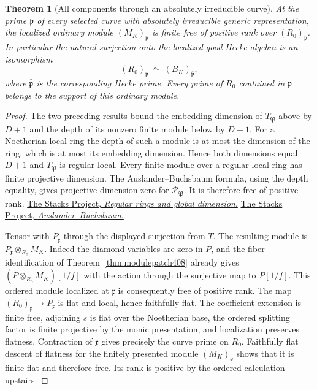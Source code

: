 \documentclass[a4paper,11pt]{article}
\newtheorem{theorem}[proposition]{Theorem}
\theoremstyle{definition}
\theoremstyle{remark}
\numberwithin{equation}{section}
\begin{document}
\begin{theorem}[All components through an absolutely irreducible curve]\leavevmode
\label{thm:irrcurvesupport409}
At the prime \(\mathfrak p\) of every selected curve with
absolutely irreducible generic representation, the localized
ordinary module \((M_K)_{\mathfrak p}\) is finite free of
positive rank over \((R_0)_{\mathfrak p}\). In particular
the natural surjection onto the localized good Hecke algebra
is an isomorphism
\[
                   (R_0)_{\mathfrak p}
                        \ \simeq\ (B_K)_{\bar{\mathfrak p}},
\]
where \(\bar{\mathfrak p}\) is the corresponding Hecke prime.
Every prime of \(R_0\) contained in \(\mathfrak p\) belongs
to the support of this ordinary module.
\end{theorem}
\begin{proof}
The two preceding results bound the embedding dimension of
\(T_{\mathfrak P}\) above by \(D+1\) and the depth of its
nonzero finite module below by \(D+1\). For a Noetherian
local ring the depth of such a module is at most the
dimension of the ring, which is at most its embedding
dimension. Hence both dimensions equal \(D+1\) and
\(T_{\mathfrak P}\) is regular local. Every finite module
over a regular local ring has finite projective dimension.
The Auslander--Buchsbaum formula, using the depth equality,
gives projective dimension zero for
\(\mathcal P_{\mathfrak P}\). It is therefore free of
positive rank. \href{https://stacks.math.columbia.edu/tag/065U}
{The Stacks Project, \emph{Regular rings and global dimension}.}
\href{https://stacks.math.columbia.edu/tag/090U}
{The Stacks Project, \emph{Auslander--Buchsbaum}.}

Tensor with \(P_{\mathfrak x}\) through the displayed
surjection from \(T\). The resulting module is
\(P_{\mathfrak x}\otimes_{R_0}M_K\). Indeed the diamond
variables are zero in \(P\), and the fiber identification
of Theorem~\ref{thm:modulepatch408} already gives
\((P\otimes_{R_0}M_K)[1/f]\) with the action through the
surjective map to \(P[1/f]\). This ordered module localized
at \(\mathfrak x\) is consequently free of positive rank.
The map \((R_0)_{\mathfrak p}\to P_{\mathfrak x}\) is flat
and local, hence faithfully flat. The coefficient extension
is finite free, adjoining \(s\) is flat over the Noetherian
base, the ordered splitting factor is finite projective
by the monic presentation, and localization preserves
flatness. Contraction of \(\mathfrak x\) gives precisely
the curve prime on \(R_0\). Faithfully flat descent of
flatness for the finitely presented module \((M_K)_{\mathfrak p}\)
shows that it is finite flat and therefore free. Its rank
is positive by the ordered calculation upstairs.


\end{proof}
\end{document}
